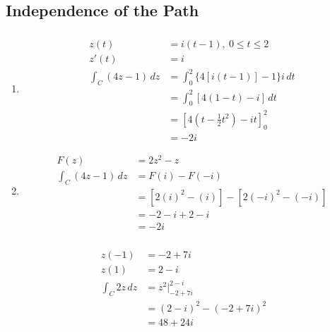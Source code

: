 \documentclass{article}
\begin{document}
\subsection{Independence of the Path}

\subsubsection{}

\begin{enumerate}
  \item

        \begin{align*}
          z(t)                   & = i (t - 1),\ 0 \le t \le 2                                     \\
          z'(t)                  & = i                                                             \\
          \int_C (4 z - 1) \,d z & = \int_0^2 \{4 [i (t - 1)] - 1\} i \,d t                        \\
                                 & = \int_0^2 [4 (1 - t) - i] \,d t                                \\
                                 & = \left[ 4 \left( t - \frac{1}{2} t^2 \right) - i t \right]_0^2 \\
                                 & = -2 i
        \end{align*}

  \item

        \begin{align*}
          F(z)                   & = 2 z^2 - z                           \\
          \int_C (4 z - 1) \,d z & = F(i) - F(-i)                        \\
                                 & = [2 (i)^2 - (i)] - [2 (-i)^2 - (-i)] \\
                                 & = -2 - i + 2 - i                      \\
                                 & = -2 i
        \end{align*}
\end{enumerate}

\setcounter{subsubsection}{2}
\subsubsection{}

\begin{align*}
  z(-1)            & = -2 + 7 i                 \\
  z(1)             & = 2 - i                    \\
  \int_C 2 z \,d z & = z^2|_{-2 + 7 i}^{2 - i}  \\
                   & = (2 - i)^2 - (-2 + 7 i)^2 \\
                   & = 48 + 24 i
\end{align*}
\end{document}
